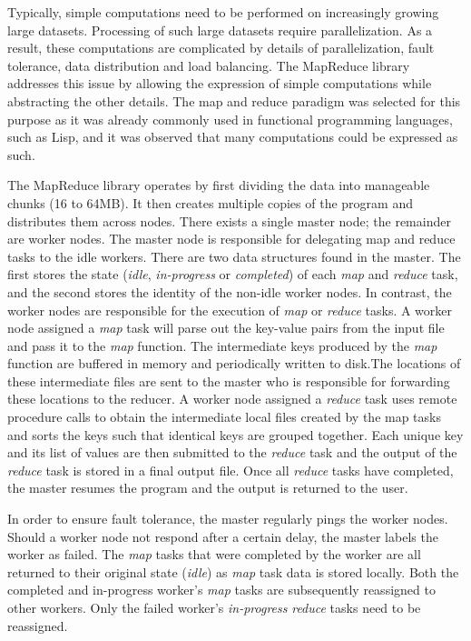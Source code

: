 \documentclass{report}
\begin{document}
        Typically, simple computations need to be performed on increasingly
        growing large datasets. Processing of such large datasets require
        parallelization. As a result, these computations are complicated by
        details of parallelization, fault tolerance, data distribution and load
        balancing. The MapReduce library addresses this issue by allowing the
        expression of simple computations while abstracting the other details.
        The map and reduce paradigm was selected for this purpose as it was
        already commonly used in functional programming languages, such as Lisp,
        and it was observed that many computations could be expressed as such.

        The MapReduce library operates by first dividing the data into
        manageable chunks (16 to 64MB). It then creates multiple copies of the
        program and distributes them across nodes. There exists a single master
        node; the remainder are worker nodes. The master node is responsible for
        delegating map and reduce tasks to the idle workers. There are two data
        structures found in the master. The first stores the state
        (\textit{idle}, \textit{in-progress} or \textit{completed}) of each
        \textit{map} and \textit{reduce} task, and the second stores the
        identity of the non-idle worker nodes. In contrast, the worker nodes are
        responsible for the execution of \textit{map} or \textit{reduce} tasks.
        A worker node assigned a \textit{map} task will parse out the key-value
        pairs from the input file and pass it to the \textit{map} function. The
        intermediate keys produced by the \textit{map} function are buffered in
        memory and periodically written to disk.The locations of these
        intermediate files are sent to the master who is responsible for
        forwarding these locations to the reducer. A worker node assigned a
        \textit{reduce} task uses remote procedure calls to obtain the
        intermediate local files created by the map tasks and sorts the keys
        such that identical keys are grouped together. Each unique key and its
        list of values are then submitted to the \textit{reduce} task and the
        output of the \textit{reduce} task is stored in a final output file.
        Once all \textit{reduce} tasks have completed, the master resumes the
        program and the output is returned to the user.

        In order to ensure fault tolerance, the master regularly pings the
        worker nodes. Should a worker node not respond after a certain delay,
        the master labels the worker as failed. The \textit{map} tasks that were
        completed by the worker are all returned to their original state
        (\textit{idle}) as \textit{map} task data is stored locally. Both the
        completed and in-progress worker's \textit{map} tasks are subsequently
        reassigned to other workers. Only the failed worker's
        \textit{in-progress} \textit{reduce} tasks need to be reassigned.
\end{document}
